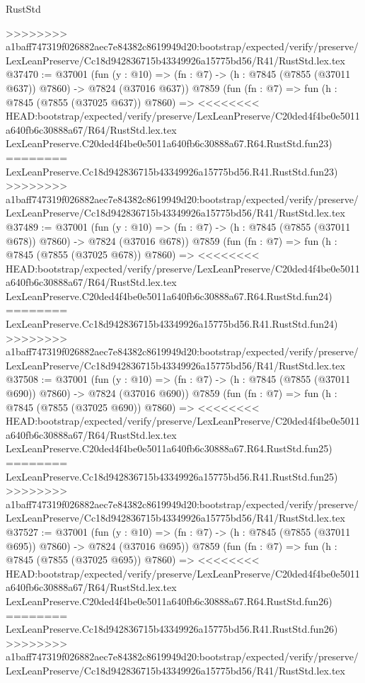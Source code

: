 \begin{lexlean}{RustStd}
\begin{coremodule}
{\begin{coremodule}
{{{{{{{{{{{{{{{{{{{{{{{{{{{{{{{{{{{{{{{{{{{{{{{{{{{{{{>>>>>>>> a1baff747319f026882aec7e84382c8619949d20:bootstrap/expected/verify/preserve/LexLeanPreserve/Cc18d942836715b43349926a15775bd56/R41/RustStd.lex.tex
@37470 := @37001
    (fun (y : @10) => (fn : @7) -> (h : @7845 (@7855 (@37011 @637)) @7860) -> @7824 (@37016 @637))
    @7859
    (fun (fn : @7) =>
    fun (h : @7845 (@7855 (@37025 @637)) @7860) =>
<<<<<<<< HEAD:bootstrap/expected/verify/preserve/LexLeanPreserve/C20ded4f4be0e5011a640fb6c30888a67/R64/RustStd.lex.tex
    LexLeanPreserve.C20ded4f4be0e5011a640fb6c30888a67.R64.RustStd.fun23)
========
    LexLeanPreserve.Cc18d942836715b43349926a15775bd56.R41.RustStd.fun23)
>>>>>>>> a1baff747319f026882aec7e84382c8619949d20:bootstrap/expected/verify/preserve/LexLeanPreserve/Cc18d942836715b43349926a15775bd56/R41/RustStd.lex.tex
@37489 := @37001
    (fun (y : @10) => (fn : @7) -> (h : @7845 (@7855 (@37011 @678)) @7860) -> @7824 (@37016 @678))
    @7859
    (fun (fn : @7) =>
    fun (h : @7845 (@7855 (@37025 @678)) @7860) =>
<<<<<<<< HEAD:bootstrap/expected/verify/preserve/LexLeanPreserve/C20ded4f4be0e5011a640fb6c30888a67/R64/RustStd.lex.tex
    LexLeanPreserve.C20ded4f4be0e5011a640fb6c30888a67.R64.RustStd.fun24)
========
    LexLeanPreserve.Cc18d942836715b43349926a15775bd56.R41.RustStd.fun24)
>>>>>>>> a1baff747319f026882aec7e84382c8619949d20:bootstrap/expected/verify/preserve/LexLeanPreserve/Cc18d942836715b43349926a15775bd56/R41/RustStd.lex.tex
@37508 := @37001
    (fun (y : @10) => (fn : @7) -> (h : @7845 (@7855 (@37011 @690)) @7860) -> @7824 (@37016 @690))
    @7859
    (fun (fn : @7) =>
    fun (h : @7845 (@7855 (@37025 @690)) @7860) =>
<<<<<<<< HEAD:bootstrap/expected/verify/preserve/LexLeanPreserve/C20ded4f4be0e5011a640fb6c30888a67/R64/RustStd.lex.tex
    LexLeanPreserve.C20ded4f4be0e5011a640fb6c30888a67.R64.RustStd.fun25)
========
    LexLeanPreserve.Cc18d942836715b43349926a15775bd56.R41.RustStd.fun25)
>>>>>>>> a1baff747319f026882aec7e84382c8619949d20:bootstrap/expected/verify/preserve/LexLeanPreserve/Cc18d942836715b43349926a15775bd56/R41/RustStd.lex.tex
@37527 := @37001
    (fun (y : @10) => (fn : @7) -> (h : @7845 (@7855 (@37011 @695)) @7860) -> @7824 (@37016 @695))
    @7859
    (fun (fn : @7) =>
    fun (h : @7845 (@7855 (@37025 @695)) @7860) =>
<<<<<<<< HEAD:bootstrap/expected/verify/preserve/LexLeanPreserve/C20ded4f4be0e5011a640fb6c30888a67/R64/RustStd.lex.tex
    LexLeanPreserve.C20ded4f4be0e5011a640fb6c30888a67.R64.RustStd.fun26)
========
    LexLeanPreserve.Cc18d942836715b43349926a15775bd56.R41.RustStd.fun26)
>>>>>>>> a1baff747319f026882aec7e84382c8619949d20:bootstrap/expected/verify/preserve/LexLeanPreserve/Cc18d942836715b43349926a15775bd56/R41/RustStd.lex.tex
}}}}}}}}}}}}}}}}}}}}}}}}}}}}}}}}}}}}}}}}}}}}}}}}}}}}}}
\end{coremodule}}
\end{coremodule}
\end{lexlean}
